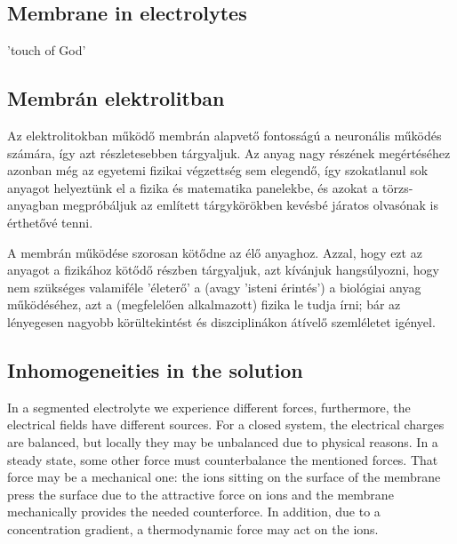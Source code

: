 \fi


\ifx\magyar\undefined

\subsection[Membrane in electrolytes]{Membrane in electrolytes\label{Physics-MembraneInElectrolytes}}

'touch of God'
\else

\subsection[Membrán elektrolitban]{Membrán elektrolitban\label{Physics-MembraneInElectrolytes}}

Az elektrolitokban működő membrán alapvető fontosságú a neuronális
működés számára, így azt részletesebben tárgyaljuk. Az anyag 
nagy részének megértéséhez azonban még az egyetemi fizikai végzettség sem elegendő, így szokatlanul sok anyagot helyeztünk el a fizika és matematika panelekbe, és azokat a törzs-anyagban megpróbáljuk
az említett tárgykörökben kevésbé járatos olvasónak is érthetővé tenni. 

A membrán működése szorosan kötődne az élő anyaghoz. Azzal, hogy
ezt az anyagot a fizikához kötődő részben tárgyaljuk,
azt kívánjuk hangsúlyozni, hogy nem szükséges valamiféle 
'életerő' a (avagy 'isteni érintés') a biológiai anyag működéséhez,
azt a (megfelelően alkalmazott) fizika le tudja írni; bár az
lényegesen nagyobb körültekintést és diszciplinákon átívelő szemléletet igényel. 
\fi

\ifx\magyar\undefined

\subsection[Inhomogeneities]{Inhomogeneities in the solution\label{sec:Physics-ElectrolyteInhomogeneity}}

In a segmented electrolyte we experience different forces, furthermore, the electrical fields 
have different sources. For a closed system, the electrical charges are balanced, but locally they may be unbalanced due to physical reasons. 
In a steady state, some other force must counterbalance
the mentioned forces. That force may be a mechanical one:
the ions sitting on the surface of the membrane press the
surface due to the attractive force on ions and the membrane mechanically provides the needed counterforce.
In addition, due to a concentration gradient, a thermodynamic force may act on the ions.


